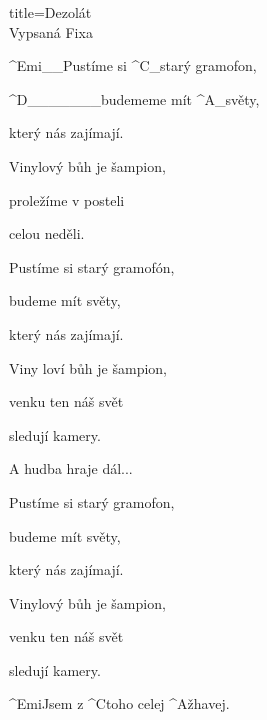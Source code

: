 \begin{song}{title=\centering Dezolát\\\normalsize Vypsaná Fixa \vspace*{-0.3cm}}
{\begin{minipage}[t]{0.48\textwidth}
	^{Emi{\color{white}\_\_}}Pustíme si ^{C{\color{white}\_}}starý gramofon, 
	
	^{D{\color{white}\_\_\_\_\_\_\_}}budememe mít ^{A{\color{white}\_}}světy, 
	
	který nás zajímají.
	
	Vinylový bůh je šampion,
	
	proležíme v posteli 
	
	celou neděli.
	
	Pustíme si starý gramofón,
	
	budeme mít světy,
	
	který nás zajímají.
	
	Viny loví bůh je šampion,
	
	venku ten náš svět 
	
	sledují kamery.
	
	\phantom{h}
	
	A hudba hraje dál...
	
	\phantom{h}	
	
	Pustíme si starý gramofon,
	
	budeme mít světy, 
	
	který nás zajímají.
	
	Vinylový bůh je šampion,
	
	venku ten náš svět 
	
	sledují kamery.
	
	\phantom{j}
	
	^{Emi}Jsem z ^{C}toho celej ^{A}žhavej.
	
	
\end{minipage}
}
\setcounter{Slokočet}{0}
\end{song}



